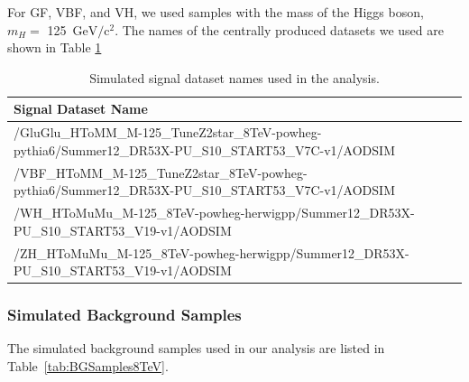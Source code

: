 \documentclass[12pt]{article}
\begin{document}
For GF, VBF, and VH, we used samples with the mass of the Higgs boson, $m_H =$ 125~$\textrm{GeV}/\textrm{c}^{2}$. 
The names of the centrally produced datasets we used are shown in Table \ref{tab:sigDatasets}

\begin{table}[htb]
\caption{Simulated signal dataset names used in the analysis.
\label{tab:sigDatasets}
}
\small
\begin{center}
\begin{tabular}{ |p{12cm}|}
\hline
Signal Dataset Name \\
\hline
\hline
/GluGlu\_HToMM\_M-125\_TuneZ2star\_8TeV-powheg-pythia6/Summer12\_DR53X-PU\_S10\_START53\_V7C-v1/AODSIM \\
\hline
/VBF\_HToMM\_M-125\_TuneZ2star\_8TeV-powheg-pythia6/Summer12\_DR53X-PU\_S10\_START53\_V7C-v1/AODSIM \\
\hline
/WH\_HToMuMu\_M-125\_8TeV-powheg-herwigpp/Summer12\_DR53X-PU\_S10\_START53\_V19-v1/AODSIM \\
\hline
/ZH\_HToMuMu\_M-125\_8TeV-powheg-herwigpp/Summer12\_DR53X-PU\_S10\_START53\_V19-v1/AODSIM \\
\hline
\end{tabular}
\end{center}
\end{table}


\subsubsection{Simulated Background Samples}

The simulated background samples used in our analysis are listed in 
Table~\ref{tab:BGSamples8TeV}.
\end{document}
